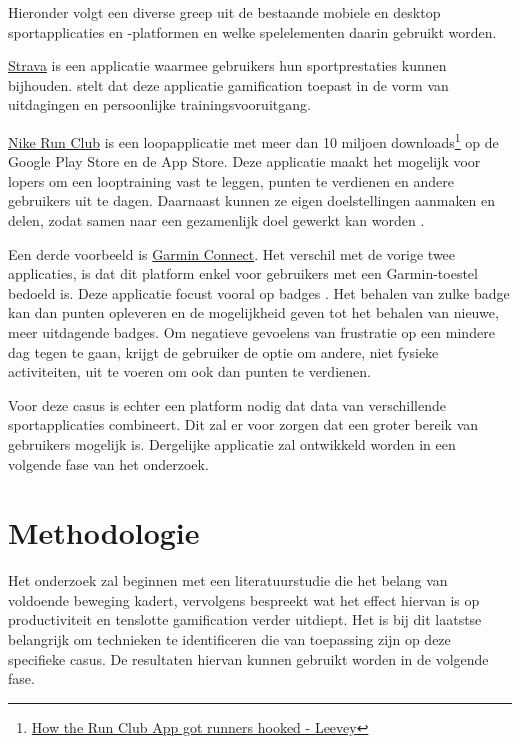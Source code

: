 Hieronder volgt een diverse greep uit de bestaande mobiele en desktop sportapplicaties en -platformen en welke spelelementen daarin gebruikt worden.

\href{https://www.strava.com/}{Strava} is een applicatie waarmee gebruikers hun sportprestaties kunnen bijhouden. \textcite{Barratt2017} stelt dat deze applicatie gamification toepast in de vorm van uitdagingen en persoonlijke trainingsvooruitgang.

\href{https://www.nike.com/be/en/nrc-app}{Nike Run Club} is een loopapplicatie met meer dan 10 miljoen downloads\footnote{\href{https://bootcamp.uxdesign.cc/how-the-nike-run-club-app-got-runners-hooked-2850c7654fc5}{How the Run Club App got runners hooked - Leevey}} op de Google Play Store en de App Store. Deze applicatie maakt het mogelijk voor lopers om een looptraining vast te leggen, punten te verdienen en andere gebruikers uit te dagen. Daarnaast kunnen ze eigen doelstellingen aanmaken en delen, zodat samen naar een gezamenlijk doel gewerkt kan worden \autocite{StaalnackeLarsson2013}.

Een derde voorbeeld is \href{https://connect.garmin.com/}{Garmin Connect}. Het verschil met de vorige twee applicaties, is dat dit platform enkel voor gebruikers met een Garmin-toestel bedoeld is. Deze applicatie focust vooral op badges \autocite{Ilhan2019}. Het behalen van zulke badge kan dan punten opleveren en de mogelijkheid geven tot het behalen van nieuwe, meer uitdagende badges. Om negatieve gevoelens van frustratie op een mindere dag tegen te gaan, krijgt de gebruiker de optie om andere, niet fysieke activiteiten, uit te voeren om ook dan punten te verdienen.

Voor deze casus is echter een platform nodig dat data van verschillende sportapplicaties combineert. Dit zal er voor zorgen dat een groter bereik van gebruikers mogelijk is. Dergelijke applicatie zal ontwikkeld worden in een volgende fase van het onderzoek.


\section{Methodologie}
\label{sec:methodologie}

Het onderzoek zal beginnen met een literatuurstudie die het belang van voldoende beweging kadert, vervolgens bespreekt wat het effect hiervan is op productiviteit en tenslotte gamification verder uitdiept. Het is bij dit laatstse belangrijk om technieken te identificeren die van toepassing zijn op deze specifieke casus. De resultaten hiervan kunnen gebruikt worden in de volgende fase.

